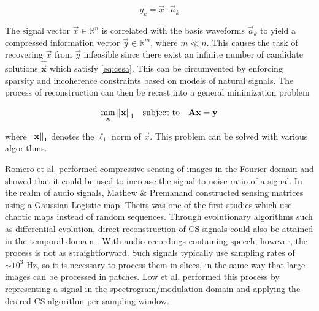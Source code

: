 \documentclass[10pt,a4paper,twoside]{article}
\begin{document}
\begin{equation}\label{eq:cesa}
	y_k = \vec{x} \cdot \vec{a}_k
\end{equation}

The signal vector $\vec{x} \in \mathbb{R}^n$ is correlated with the basis waveforms $\vec{a}_k$ to yield a compressed information vector $\vec{y} \in \mathbb{R}^m$, where $m \ll n$. This causes the task of recovering $\vec{x}$ from $\vec{y}$ infeasible since there exist an infinite number of candidate solutions $\bm\hat{\vec{x}}$ which satisfy \eqref{eq:cesa}. This can be circumvented by enforcing sparsity and incoherence constraints \cite{Candes2008b} based on models of natural signals. The process of reconstruction can then be recast into a general minimization problem

\begin{equation}\label{eq:minl1}
	\min_{\text{\bfseries x}} \norm{\text{\bfseries x}}_1 \quad \textrm{subject to} \quad \text{\bfseries A}\text{\bfseries x} = \text{\bfseries y}
\end{equation}

\noindent where $\norm{\text{\bfseries x}}_1$ denotes the $\ell_1$ norm of $\vec{x}$. This problem can be solved with various algorithms.

Romero et al. \cite{Romero2016} performed compressive sensing of images in the Fourier domain and showed that it could be used to increase the signal-to-noise ratio of a signal. In the realm of audio signals, Mathew \& Premanand \cite{Mathew2016} constructed sensing matrices using a Gaussian-Logistic map. Theirs was one of the first studies which use chaotic maps instead of random sequences. Through evolutionary algorithms such as differential evolution, direct reconstruction of CS signals could also be attained in the temporal domain \cite{Andras2018}. With audio recordings containing speech, however, the process is not as straightforward. Such signals typically use sampling rates of $\sim 10^{3}$ Hz, so it is necessary to process them in slices, in the same way that large images can be processed in patches. Low et al. \cite{Low2018} performed this process by representing a signal in the spectrogram/modulation domain and applying the desired CS algorithm per sampling window.
\end{document}
